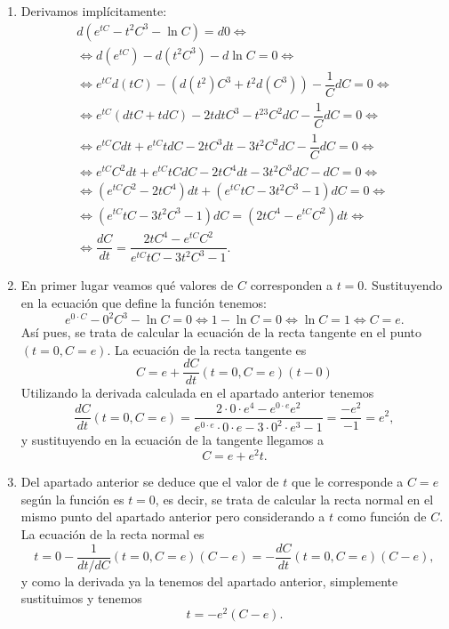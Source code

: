 {\begin{enumerate}
\item Derivamos implícitamente:
\[
\renewcommand{\arraystretch}{2}
\begin{array}{c}
d(e^{tC}-t^2C^3-\ln{C})=d0 \Leftrightarrow\\
\Leftrightarrow d(e^{tC})-d(t^2C^3)-d\ln{C}= 0 \Leftrightarrow\\
\Leftrightarrow e^{tC}d(tC)-(d(t^2)C^3+t^2d(C^3))-\dfrac{1}{C}dC= 0 \Leftrightarrow\\
\Leftrightarrow e^{tC}(dtC+tdC)-2tdtC^3-t^23C^2dC-\dfrac{1}{C}dC= 0 \Leftrightarrow\\
\Leftrightarrow e^{tC}Cdt+e^{tC}tdC-2tC^3dt-3t^2C^2dC-\dfrac{1}{C}dC= 0 \Leftrightarrow\\
\Leftrightarrow e^{tC}C^2dt+e^{tC}tCdC-2tC^4dt-3t^2C^3dC-dC= 0 \Leftrightarrow\\
\Leftrightarrow (e^{tC}C^2-2tC^4)dt+(e^{tC}tC-3t^2C^3-1)dC= 0 \Leftrightarrow\\
\Leftrightarrow (e^{tC}tC-3t^2C^3-1)dC= (2tC^4-e^{tC}C^2)dt \Leftrightarrow\\
\Leftrightarrow \dfrac{dC}{dt}=\dfrac{2tC^4-e^{tC}C^2}{e^{tC}tC-3t^2C^3-1}.
\end{array}
\]

\item En primer lugar veamos qué valores de $C$ corresponden a $t=0$. Sustituyendo en la ecuación que define la función tenemos:
\[
e^{0\cdot C}-0^2C^3-\ln C = 0 \Leftrightarrow 1-\ln C = 0 \Leftrightarrow \ln C = 1 \Leftrightarrow C = e.
\]
Así pues, se trata de calcular la ecuación de la recta tangente en el punto $(t=0, C=e)$. La ecuación de la recta tangente es
\[
C = e+\dfrac{dC}{dt}(t=0,C=e)(t-0)
\]
Utilizando la derivada calculada en el apartado anterior tenemos
\[
\dfrac{dC}{dt}(t=0,C=e)=\dfrac{2\cdot 0\cdot e^4-e^{0\cdot e}e^2}{e^{0\cdot e}\cdot 0\cdot e-3\cdot 0^2\cdot e^3-1} = \dfrac{-e^2}{-1} = e^2,
\]
y sustituyendo en la ecuación de la tangente llegamos a
\[
C= e+e^2 t.
\]

\item Del apartado anterior se deduce que el valor de $t$ que le corresponde a $C=e$ según la función es $t=0$, es decir, se trata de calcular la recta normal en el mismo punto del apartado anterior pero considerando a $t$ como función de $C$. La ecuación de la recta normal es
\[
t = 0-\dfrac{1}{dt/dC}(t=0,C=e)(C-e) = -\dfrac{dC}{dt}(t=0,C=e)(C-e),
\]
y como la derivada ya la tenemos del apartado anterior, simplemente sustituimos y tenemos
\[
t= -e^2(C-e).
\]
\end{enumerate}
}



